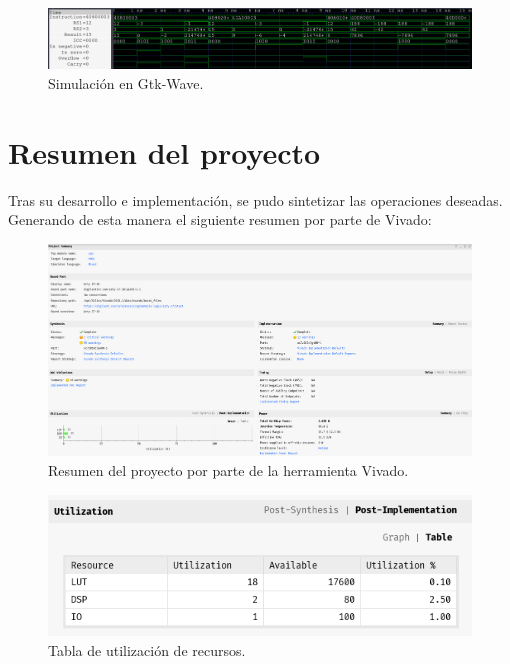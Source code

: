 \documentclass[
  11pt, %
  codirector, %
]{charter}
\begin{document}

\begin{figure}[htpb]
  \centering
  \includegraphics[width=1\textwidth]{./Figuras/gtkwave.png}
  \caption{Simulación en Gtk-Wave.}
  \label{fig:gtkwave}
\end{figure}

\vspace{25px}

\section{Resumen del proyecto}
\label{sec:org0000001}

Tras su desarrollo e implementación, se pudo sintetizar las operaciones deseadas. Generando de esta manera el siguiente resumen por parte de Vivado:

\begin{figure}[htpb]
  \centering
  \includegraphics[width=1\textwidth]{./Figuras/project-summary.png}
  \caption{Resumen del proyecto por parte de la herramienta Vivado.}
  \label{fig:project-summary}
\end{figure}

\vspace{25px}

\newpage

\begin{figure}[htpb]
  \centering
  \includegraphics[width=.5\textwidth]{./Figuras/utilization-table.png}
  \caption{Tabla de utilización de recursos.}
  \label{fig:utilization-table}
\end{figure}
\end{document}

